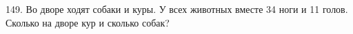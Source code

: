 149. Во дворе ходят собаки и куры. У всех животных вместе 34 ноги и 11 голов. Сколько на дворе кур и сколько собак?\\
